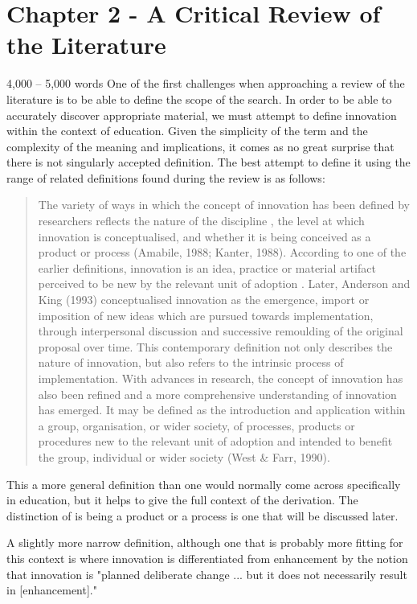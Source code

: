 \section{Chapter 2 - A Critical Review of the Literature}
4,000 – 5,000 words
One of the first challenges when approaching a review of the literature is to be able to define the scope of the search. In order to be able to accurately discover appropriate material, we must attempt to define innovation within the context of education. Given the simplicity of the term and the complexity of the meaning and implications, it comes as no great surprise that there is not singularly accepted definition. The best attempt to define it using the range of related definitions found during the review is as follows:

\begin{quote}
The variety of ways in which the concept of innovation has been defined by researchers reflects the nature of the discipline \cite{Gopalakrishnan_1994}, the level at which innovation is conceptualised, and whether it is being conceived as a product or process (Amabile, 1988; Kanter, 1988). According to one of the earlier definitions, innovation is an idea, practice or material artifact perceived to be new by the relevant unit of adoption \cite{Allen_1975}. Later, Anderson and King (1993) conceptualised innovation as the emergence, import or imposition of new ideas which are pursued towards implementation, through interpersonal discussion and successive remoulding of the original proposal over time. This contemporary definition not only describes the nature of innovation, but also refers to the intrinsic process of implementation. With advances in research, the concept of innovation has also been refined and a more comprehensive understanding of innovation has emerged. It may be defined as the introduction and application within a group, organisation, or wider society, of processes, products or procedures new to the relevant unit of adoption and intended to benefit the group, individual or wider society (West & Farr, 1990).
\end{quote}  \cite{Sharma_2005}

This a more general definition than one would normally come across specifically in education, but it helps to give the full context of the derivation. The distinction of is being a product or a process \cite{} is one that will be discussed later.

A slightly more narrow definition, although one that is probably more fitting for this context is where innovation is differentiated from enhancement by the notion that innovation is "planned deliberate change ... but it does not necessarily result in [enhancement]." \cite{hannan2002innovative}

